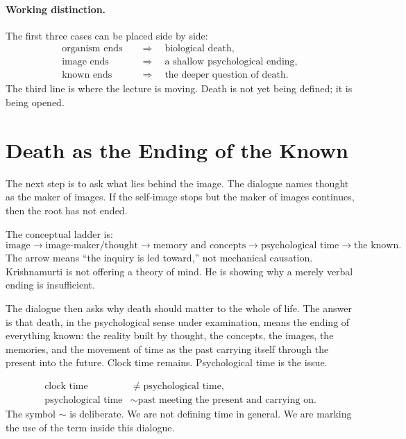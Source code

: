 \paragraph{Working distinction.}
The first three cases can be placed side by side:
\begin{align}
\text{organism ends} &\quad \Rightarrow \quad \text{biological death}, \\
\text{image ends} &\quad \Rightarrow \quad \text{a shallow psychological ending}, \\
\text{known ends} &\quad \Rightarrow \quad \text{the deeper question of death}.
\end{align}
The third line is where the lecture is moving. Death is not yet being defined; it is being opened.

\section{Death as the Ending of the Known}

The next step is to ask what lies behind the image. The dialogue names thought as the maker of images. If the self-image stops but the maker of images continues, then the root has not ended.

The conceptual ladder is:
\begin{equation}
\text{image}
\longrightarrow
\text{image-maker/thought}
\longrightarrow
\text{memory and concepts}
\longrightarrow
\text{psychological time}
\longrightarrow
\text{the known}.
\end{equation}
The arrow means ``the inquiry is led toward,'' not mechanical causation. Krishnamurti is not offering a theory of mind. He is showing why a merely verbal ending is insufficient.

The dialogue then asks why death should matter to the whole of life. The answer is that death, in the psychological sense under examination, means the ending of everything known: the reality built by thought, the concepts, the images, the memories, and the movement of time as the past carrying itself through the present into the future. Clock time remains. Psychological time is the issue.

\begin{align}
\text{clock time} &\neq \text{psychological time}, \\
\text{psychological time} &\sim \text{past meeting the present and carrying on}.
\end{align}
The symbol $\sim$ is deliberate. We are not defining time in general. We are marking the use of the term inside this dialogue.

